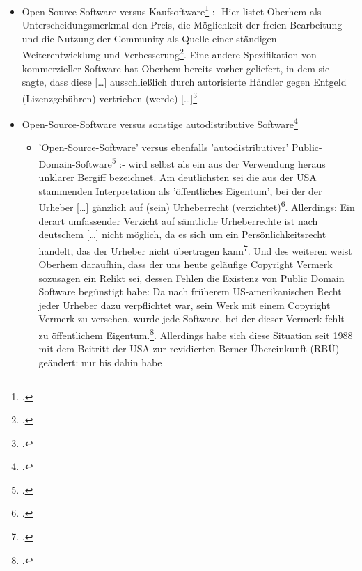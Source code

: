 \documentclass[DIV=calc,BCOR=5mm,11pt,headings=small,oneside,abstract=true, toc=bib]{scrartcl}
\begin{document}
\begin{itemize}
  \item \glqq{}Open-Source-Software\grqq{} versus
  \glqq{}Kaufsoftware\grqq{}\footcite[vgl.][27f]{Oberhem2008a} :- Hier listet
  Oberhem als Unterscheidungsmerkmal den Preis, die \glqq{}Möglichkeit
  der freien Bearbeitung\grqq{} und die Nutzung der Community als Quelle einer
  \glqq{}ständigen Weiterentwicklung und
  Verbesserung\grqq{}\footcite[vgl.][28. So intutitiv passend die
  Unterschiedung in kommerzielle Software und nicht kommerzielle
  Software auch sein mag, so sehr wird noch zu überlegen sein, ob die hier
  genannten Kriterien eine Systematik wirklich tragen]{Oberhem2008a}. Eine
  andere Spezifikation von \glqq{}kommerzieller Software\grqq{} hat Oberhem
  bereits vorher geliefert, in dem sie sagte, dass diese \glqq{}[\ldots]
  ausschließlich durch autorisierte Händler gegen Entgeld
  (Lizenzgebühren) vertrieben (werde)
  [\ldots]\grqq{}\footcite[vgl.][6]{Oberhem2008a}
  \item \glqq{}Open-Source-Software\grqq{} versus \glqq{}sonstige
  autodistributive Software\grqq{}\footcite[vgl.][28ff]{Oberhem2008a}
  \begin{itemize}
    \item 'Open-Source-Software' versus ebenfalls 'autodistributiver'
    \glqq{}Public-Domain-Software\grqq{}\footcite[vgl.][29]{Oberhem2008a} :-
    wird selbst als ein aus der Verwendung heraus \glqq{}unklarer Bergiff\grqq{}
    bezeichnet. Am deutlichsten sei die aus der USA stammenden Interpretation
    als 'öffentliches Eigentum', bei der der Urheber \glqq{}[\ldots]
    gänzlich auf (sein) Urheberrecht
    (verzichtet)\grqq{}\footcite[vgl.][30]{Oberhem2008a}. Allerdings: \glqq{}Ein
    derart umfassender Verzicht auf sämtliche Urheberrechte ist nach deutschem
    [\ldots] nicht möglich, da es sich um ein Persönlichkeitsrecht handelt, das
    der Urheber nicht übertragen kann\grqq{}\footcite[][30]{Oberhem2008a}. Und
    des weiteren weist Oberhem daraufhin, dass der uns heute geläufige
    \glqq{}Copyright Vermerk\grqq{} sozusagen ein Relikt sei, dessen Fehlen die
    Existenz von Public Domain Software begünstigt habe: \glqq{}Da nach
    früherem US-amerikanischen Recht jeder Urheber dazu verpflichtet war,
    sein Werk mit einem Copyright Vermerk zu versehen, wurde jede
    Software, bei der dieser Vermerk fehlt zu öffentlichem
    Eigentum.\grqq{}\footcite[][30]{Oberhem2008a}. Allerdings habe sich diese
    Situation seit 1988 mit dem \glqq{}Beitritt der USA zur revidierten
    Berner Übereinkunft (RBÜ)\grqq{} geändert: nur bis dahin habe

\end{itemize}
\end{itemize}
\end{document}
